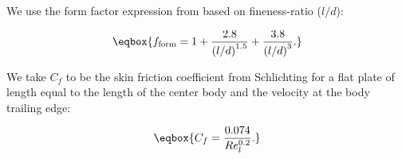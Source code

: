 \noindent We use the form factor expression from   based on fineness-ratio (\(l/d\)):

\begin{equation}
    \eqbox{
    f_\text{form} = 1 + \frac{2.8}{\left(l/d\right)^{1.5}} + \frac{3.8}{\left(l/d\right)^3}.
}
\end{equation}

\noindent We take \(C_f\) to be the skin friction coefficient from Schlichting for a flat plate of length equal to the length of the center body and the velocity at the body trailing edge:

\begin{equation}
    \eqbox{
    C_f = \frac{0.074}{Re_l^{0.2}}.
}
\end{equation}

